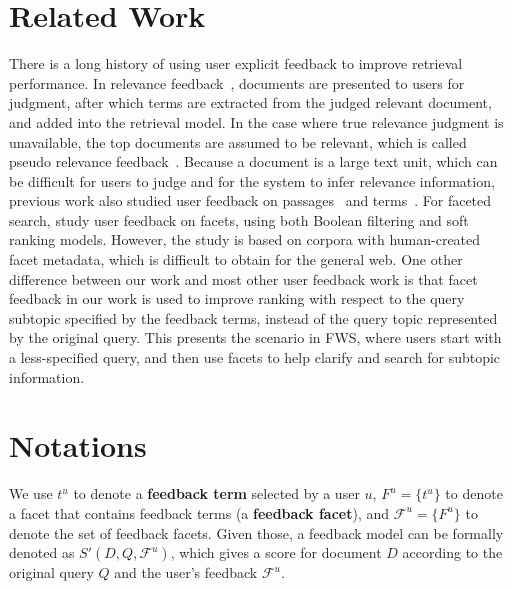 \section{Related Work}
\label{sec:feedback-related}
There is a long history of using user explicit feedback to improve retrieval performance. In relevance feedback~\cite{rocchio71relevance,salton1997improving}, documents are presented to users for judgment, after which terms are extracted from the judged relevant document, and added into the retrieval model. In the case where true relevance judgment is unavailable, the top documents are assumed to be relevant, which is called pseudo relevance feedback~\cite{buckley1995automatic,abdul2004umass}. Because a document is a large text unit, which can be difficult for users to judge and for the system to infer relevance information, previous work also studied user feedback on passages~\cite{allan1995relevance,xu1996query} and terms~\cite{koenemann1996case,tan2007term}. For faceted search, \citet{zhang2010interactive} study user feedback on facets, using both Boolean filtering and soft ranking models. However, the study is based on corpora with human-created facet metadata, which is difficult to obtain for the 
general web.  One other difference between our work and most other user feedback work is that facet feedback in our work is used to improve ranking with respect to the query subtopic specified by the feedback terms, instead of the query topic represented by the original query. This presents the scenario in FWS, where users start with a less-specified query, and then use facets to help clarify and search for subtopic information.

\section{Notations} \label{sec:fdbk-notations}
We use $t^u$ to denote a \textbf{feedback term} selected by a user $u$, $F^u=\{t^u\}$ to denote a facet that contains feedback terms (a \textbf{feedback facet}), and $\mathcal{F}^u=\{F^u\}$ to denote the set of feedback facets. Given those, a feedback model can be formally denoted as $S'(D,Q,\mathcal{F}^u)$, which gives a score for document $D$ according to the original query $Q$ and the user's feedback $\mathcal{F}^u$. 

